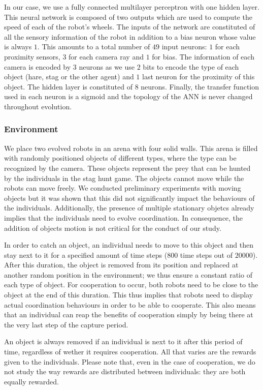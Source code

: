     In our case, we use a fully connected multilayer perceptron with one hidden layer. This neural network is composed of two outputs which are used to compute the speed of each of the robot's wheels. The inputs of the network are constituted of all the sensory information of the robot in addition to a bias neuron whose value is always $1$. This amounts to a total number of $49$ input neurons: $1$ for each proximity sensors, $3$ for each camera ray and $1$ for bias. The information of each camera is encoded by $3$ neurons as we use $2$ bits to encode the type of each object (hare, stag or the other agent) and $1$ last neuron for the proximity of this object. The hidden layer is constituted of $8$ neurons. Finally, the transfer function used in each neuron is a sigmoid and the topology of the ANN is never changed throughout evolution.

    \subsubsection{Environment} We place two evolved robots in an arena with four solid walls. This arena is filled with randomly positioned objects of different types, where the type can be recognized by the camera. These objects represent the prey that can be hunted by the individuals in the stag hunt game. The objects cannot move while the robots can move freely. We conducted preliminary experiments with moving objects but it was shown that this did not significantly impact the behaviours of the individuals. Additionally, the presence of multiple stationary objetcs already implies that the individuals need to evolve coordination. In consequence, the addition of objects motion is not critical for the conduct of our study.

    In order to catch an object, an individual needs to move to this object and then stay next to it for a specified amount of time steps ($800$ time steps out of $20000$). After this duration, the object is removed from its position and replaced at another random position in the environment; we thus ensure a constant ratio of each type of object. For cooperation to occur, both robots need to be close to the object at the end of this duration. This thus implies that robots need to display actual coordination behaviours in order to be able to cooperate. This also means that an individual can reap the benefits of cooperation simply by being there at the very last step of the capture period.

    An object is always removed if an individual is next to it after this period of time, regardless of wether it requires cooperation. All that varies are the rewards given to the individuals. Please note that, even in the case of cooperation, we do not study the way rewards are distributed between individuals: they are both equally rewarded.

